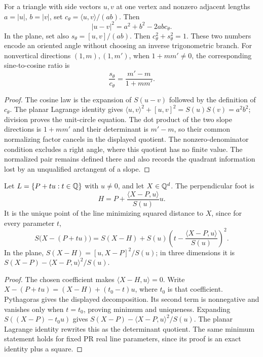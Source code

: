 \begin{theorem}
\label{geo:cosine}
For a triangle with side vectors $u,v$ at one vertex and nonzero adjacent
lengths $a=|u|$, $b=|v|$, set
$c_\theta=\langle u,v\rangle/(ab)$. Then
\[
 |u-v|^2=a^2+b^2-2ab c_\theta.
\]
In the plane, set also $s_\theta=[u,v]/(ab)$. Then
$c_\theta^2+s_\theta^2=1$. These two numbers encode an oriented angle
without choosing an inverse trigonometric branch. For nonvertical directions
$(1,m),(1,m')$, when $1+mm'\ne0$, the corresponding sine-to-cosine ratio is
\[
 \frac{s_\theta}{c_\theta}=\frac{m'-m}{1+mm'}.
\]
\end{theorem}
\begin{proof}
The cosine law is the expansion of $S(u-v)$ followed by the definition of
$c_\theta$. The planar Lagrange identity gives
$\langle u,v\rangle^2+[u,v]^2=S(u)S(v)=a^2b^2$;
division proves the unit-circle equation. The dot product of the two slope
directions is $1+mm'$ and their determinant is $m'-m$, so their common
normalizing factor cancels in the displayed quotient. The nonzero-denominator
condition excludes a right angle, where this quotient has no finite value.
The normalized pair remains defined there and also records the quadrant
information lost by an unqualified arctangent of a slope.
\end{proof}

\begin{theorem}
\label{geo:projection}
Let $L=\{P+tu:t\in\mathbb Q\}$ with $u\ne0$, and let $X\in\mathbb Q^d$.
The perpendicular foot is
\[
 H=P+\frac{\langle X-P,u\rangle}{S(u)}u.
\]
It is the unique point of the line minimizing squared distance to $X$, since
for every parameter $t$,
\[
 S\bigl(X-(P+tu)\bigr)
 =S(X-H)+S(u)\left(t-\frac{\langle X-P,u\rangle}{S(u)}\right)^2.
\]
In the plane,
$S(X-H)=[u,X-P]^2/S(u)$; in three dimensions it is
$S(X-P)-\langle X-P,u\rangle^2/S(u)$.
\end{theorem}
\begin{proof}
The chosen coefficient makes $\langle X-H,u\rangle=0$.
Write $X-(P+tu)=(X-H)+(t_0-t)u$, where $t_0$ is that coefficient.
Pythagoras gives the displayed decomposition. Its second term is nonnegative
and vanishes only when $t=t_0$, proving minimum and uniqueness.
Expanding $S((X-P)-t_0u)$ gives
$S(X-P)-\langle X-P,u\rangle^2/S(u)$. The planar Lagrange identity rewrites
this as the determinant quotient. The same minimum statement holds for fixed
PR real line parameters, since its proof is an exact identity plus a square.
\end{proof}

